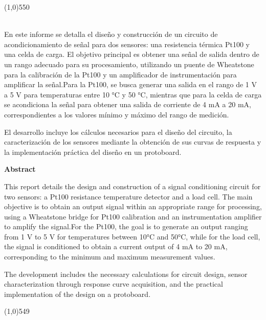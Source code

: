 \documentclass{article}
\renewenvironment{abstract}%
 {\par\noindent\textbf{\abstractname}\ \ignorespaces \\}
 {\par\noindent\medskip}
\begin{document}
\noindent
\line(1,0){550}
\begin{abstract}
En este informe se detalla el diseño y construcción de un circuito de acondicionamiento de señal para dos sensores: una resistencia térmica Pt100 y una celda de carga. El objetivo principal es obtener una señal de salida dentro de un rango adecuado para su procesamiento, utilizando un puente de Wheatstone para la calibración de la Pt100 y un amplificador de instrumentación para amplificar la señal.Para la Pt100, se busca generar una salida en el rango de 1 V a 5 V para temperaturas entre 10 °C y 50 °C, mientras que para la celda de carga se acondiciona la señal para obtener una salida de corriente de 4 mA a 20 mA, correspondientes a los valores mínimo y máximo del rango de medición.

\vspace{0.2cm}

El desarrollo incluye los cálculos necesarios para el diseño del circuito, la caracterización de los sensores mediante la obtención de sus curvas de respuesta y la implementación práctica del diseño en un protoboard.

\vspace{0.2cm}

\textbf{Abstract}

\vspace{0.2cm}

This report details the design and construction of a signal conditioning circuit for two sensors: a Pt100 resistance temperature detector and a load cell. The main objective is to obtain an output signal within an appropriate range for processing, using a Wheatstone bridge for Pt100 calibration and an instrumentation amplifier to amplify the signal.For the Pt100, the goal is to generate an output ranging from 1 V to 5 V for temperatures between 10°C and 50°C, while for the load cell, the signal is conditioned to obtain a current output of 4 mA to 20 mA, corresponding to the minimum and maximum measurement values.

\vspace{0.2cm}

The development includes the necessary calculations for circuit design, sensor characterization through response curve acquisition, and the practical implementation of the design on a protoboard.


\end{abstract}
\line(1,0){549}
\medskip
\end{document}
